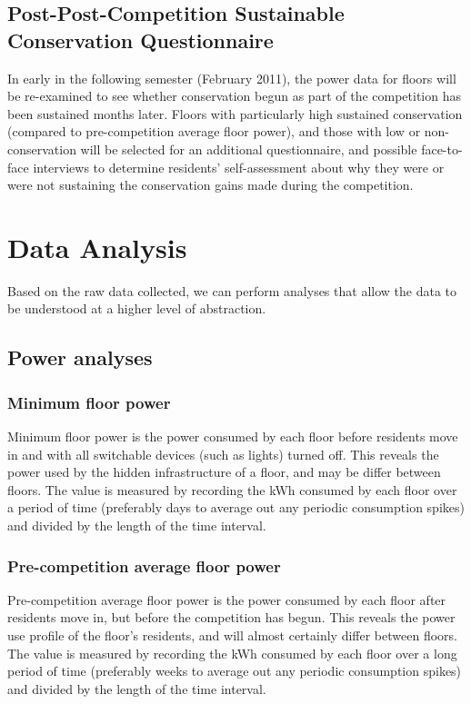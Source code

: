 \subsection{Post-Post-Competition Sustainable Conservation Questionnaire}

In early in the following semester (February 2011), the power data for floors will be re-examined to see whether conservation begun as part of the competition has been sustained months later. Floors with particularly high sustained conservation (compared to pre-competition average floor power), and those with low or non-conservation will be selected for an additional questionnaire, and possible face-to-face interviews to determine residents' self-assessment about why they were or were not sustaining the conservation gains made during the competition.

\section{Data Analysis}

Based on the raw data collected, we can perform analyses that allow the data to be understood at a higher level of abstraction.

\subsection{Power analyses}

\subsubsection{Minimum floor power}
\label{sec:min-floor-power}
Minimum floor power is the power consumed by each floor before residents move in and with all switchable devices (such as lights) turned off. This reveals the power used by the hidden infrastructure of a floor, and may be differ between floors. The value is measured by recording the kWh consumed by each floor over a period of time (preferably days to average out any periodic consumption spikes) and divided by the length of the time interval.

\subsubsection{Pre-competition average floor power}
Pre-competition average floor power is the power consumed by each floor after residents move in, but before the competition has begun. This reveals the power use profile of the floor's residents, and will almost certainly differ between floors. The value is measured by recording the kWh consumed by each floor over a long period of time (preferably weeks to average out any periodic consumption spikes) and divided by the length of the time interval.

